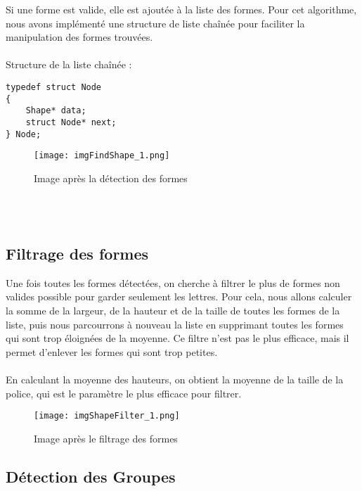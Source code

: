 \documentclass{article}
\begin{document}
Si une forme est valide, elle est ajoutée à la liste des formes. Pour cet algorithme, nous avons implémenté une structure de liste chaînée pour faciliter la manipulation des formes trouvées.
\\\\
Structure de la liste chaînée :
\begin{lstlisting}
typedef struct Node
{
    Shape* data;
    struct Node* next;
} Node;
\end{lstlisting}

\vspace{0.5cm}

\begin{figure}[H]
    \centering
    \texttt{[image: imgFindShape\_1.png]}
    \caption{Image après la détection des formes}
\end{figure}
\\\\

\subsection{Filtrage des formes}

Une fois toutes les formes détectées, on cherche à filtrer le plus de formes non valides possible pour garder seulement les lettres. Pour cela, nous allons calculer la somme de la largeur, de la hauteur et de la taille de toutes les formes de la liste, puis nous parcourrons à nouveau la liste en supprimant toutes les formes qui sont trop éloignées de la moyenne. Ce filtre n'est pas le plus efficace, mais il permet d'enlever les formes qui sont trop petites.
\\\\
En calculant la moyenne des hauteurs, on obtient la moyenne de la taille de la police, qui est le paramètre le plus efficace pour filtrer.

\begin{figure}[H]
    \centering
    \texttt{[image: imgShapeFilter\_1.png]}
    \caption{Image après le filtrage des formes}
\end{figure}

\subsection{Détection des Groupes}
\end{document}
